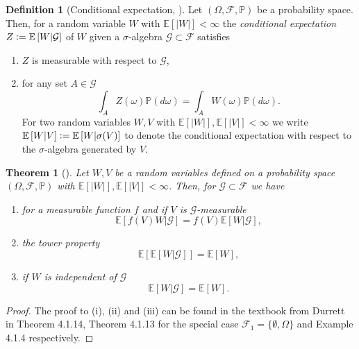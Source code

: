 \documentclass[12pt]{article}
\newtheorem{theorem}{Theorem}[section]
\theoremstyle{definition}
\newtheorem{definition}[definition]{Definition}
\numberwithin{equation}{section}
\newcommand{\BP}{\mathbb{P}}
\newcommand{\CF}{\mathcal{F}}
\newcommand{\CG}{\mathcal{G}}
\newcommand{\ev}[1]{\mathbb{E}\left[{#1}\right]}
\newcommand{\defeq}{\vcentcolon=}
\begin{document}
 \begin{definition}[Conditional expectation, ]
  Let  $(\Omega, \CF, \BP)$ be a probability space. Then, for a random variable $W$ with $\ev{|W|} < \infty$ the \emph{conditional expectation} $Z \defeq \ev{W|\CG}$ of $W$ given a $\sigma$-algebra $\CG \subset \CF$ satisfies
  \begin{enumerate}[label=(\roman*)]
    \item $Z$ is measurable with respect to $\CG$,
    \item for any set $A \in \CG$
    \begin{equation*}
      \int_A Z(\omega)\BP(d\omega) = \int_A W(\omega)\BP(d\omega).
    \end{equation*}
    For two random variables $W,V$ with $\ev{|W|},\ev{|V|} < \infty$ we write $\ev{W|V} \defeq \ev{W|\sigma(V)}$ to denote the conditional expectation with respect to the $\sigma$-algebra generated by $V$.
  \end{enumerate}
 \end{definition}
 \begin{theorem}[]
  \label{thm:conditional_expectation}
  Let $W, V$ be a random variables defined on a probability space $(\Omega, \CF, \BP)$ with $\ev{|W|},\ev{|V|} < \infty$. Then, for $\CG \subset \CF$ we have
  \begin{enumerate}[label=(\roman*)]
    \item for a measurable function $f$ and if $V$ is $\CG$-measurable
    \begin{equation*}
      \ev{f(V)W|\CG} = f(V)\ev{W|\CG},
    \end{equation*}
    \item the tower property
    \begin{equation*}
      \ev{\ev{W|\CG}} = \ev{W},
    \end{equation*}
    \item if $W$ is independent of $\CG$
    \begin{equation*}
      \ev{W|\CG} = \ev{W}.
    \end{equation*}
    
  \end{enumerate}
 \end{theorem}
 \begin{proof}
  The proof to (i), (ii) and (iii) can be found in the textbook from Durrett \cite{durrettProbabilityTheoryExamples2019} in Theorem 4.1.14, Theorem 4.1.13 for the special case $\CF_1 = \{\emptyset, \Omega\}$ and Example 4.1.4 respectively.
 \end{proof}
\end{document}
